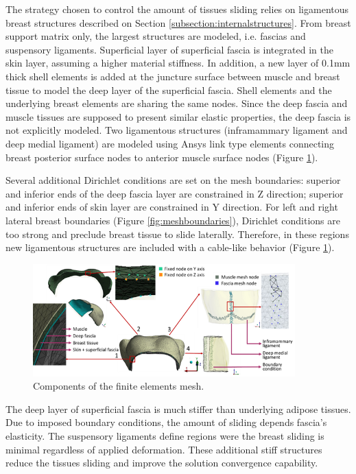 The strategy chosen to control the amount of tissues sliding relies on ligamentous breast structures described on Section \ref{subsection:internalstructures}. From breast support matrix only, the largest structures are modeled, i.e. fascias and suspensory ligaments.  Superficial layer of superficial fascia is integrated in the skin layer, assuming a higher material stiffness. In addition, a new layer of 0.1mm thick shell elements is added at the juncture surface between muscle and breast tissue to model the deep layer of the superficial fascia. Shell elements and the underlying breast elements are sharing the same nodes. Since the deep fascia and muscle tissues are supposed to present similar elastic properties, the deep fascia is not explicitly modeled. Two ligamentous structures (inframammary ligament and deep medial ligament) are modeled using Ansys link type elements connecting breast posterior surface nodes to anterior muscle surface nodes (Figure \ref{fig:mesh_components_BC}).  


Several additional Dirichlet conditions are set on the mesh boundaries: superior and inferior ends of the deep fascia layer are constrained in Z direction; superior and inferior ends of skin layer are constrained in Y direction. For left and right lateral breast boundaries (Figure \ref{fig:meshboundaries}), Dirichlet conditions are too strong and preclude breast tissue to slide laterally. Therefore, in these regions new ligamentous structures are included with a cable-like behavior (Figure \ref{fig:mesh_components_BC}).



\begin{figure}[!h]
\centering
\includegraphics[width=0.9\textwidth,keepaspectratio]{figures/mesh_components.png} 
\caption{Components of the finite elements mesh.}\label{fig:mesh_components_BC}
\end{figure}

 The deep layer of superficial fascia is much stiffer than underlying adipose tissues. Due to imposed boundary conditions, the amount of sliding depends fascia's elasticity. The suspensory ligaments define regions were the breast sliding is minimal regardless of applied deformation. These additional stiff structures reduce the tissues sliding and improve the solution convergence capability. 

